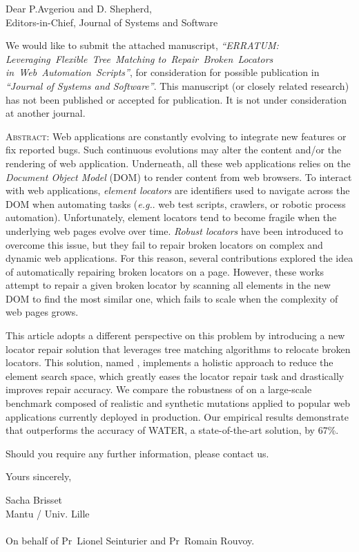 \documentclass{letter}
\begin{document}
\begin{letter}{}
\opening{Dear P.Avgeriou and D. Shepherd,\\Editors-in-Chief, Journal of Systems and Software}

We would like to submit the attached manuscript, \emph{``ERRATUM: \em Leveraging~Flexible~Tree~Matching to~Repair~Broken~Locators in~Web~Automation~Scripts''}, for consideration for possible publication in \emph{``Journal of Systems and Software''}.
This manuscript (or closely related research) has not been published or accepted for publication. It is not under consideration at another journal.

\textsc{Abstract}:
Web applications are constantly evolving to integrate new features or fix reported bugs.
Such continuous evolutions may alter the content and/or the rendering of web application.
Underneath, all these web applications relies on the \emph{Document Object Model} (DOM) to render content from web browsers.
To interact with web applications, \emph{element locators} are identifiers used to navigate across the DOM when automating tasks (\emph{e.g.}. web test scripts, crawlers, or robotic process automation).
Unfortunately, element locators tend to become fragile when the underlying web pages evolve over time.
% 
\emph{Robust locators} have been introduced to overcome this issue, but they fail to repair broken locators on complex and dynamic web applications.
For this reason, several contributions explored the idea of automatically repairing broken locators on a page. 
However, these works attempt to repair a given broken locator by scanning all elements in the new DOM to find the most similar one, which fails to scale when the complexity of web pages grows.

This article adopts a different perspective on this problem by introducing a new locator repair solution that leverages tree matching algorithms to relocate broken locators.
This solution, named \erratum{}, implements a holistic approach to reduce the element search space, which greatly eases the locator repair task and drastically improves repair accuracy.
% 
We compare the robustness of \erratum{} on a large-scale benchmark composed of realistic and synthetic mutations applied to popular web applications currently deployed in production.
Our empirical results demonstrate that \erratum{} outperforms the accuracy of WATER, a state-of-the-art solution, by 67\%.

Should you require any further information, please contact us.

Yours sincerely,

Sacha Brisset\\
Mantu / Univ. Lille\\
\\
On behalf of Pr~Lionel Seinturier and Pr~Romain Rouvoy.
\end{letter}
\end{document}
